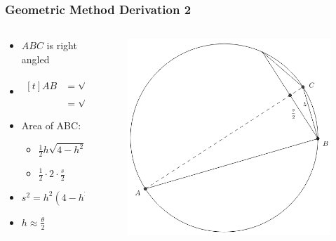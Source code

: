 \documentclass[12pt]{beamer}
\begin{document}
\begin{frame}
\frametitle{Geometric Method Derivation 2}
\begin{columns}
	\begin{column}{0.5\textwidth}
	\begin{itemize}[<+(1)->]
		\item \(ABC\) is right angled
		\item \(\begin{aligned}[t]AB &= \sqrt{AC^2 - BC^2}\\ &= \sqrt{4-h^2}\end{aligned}\)
		\item Area of ABC:
		\begin{itemize}[<+(1)->]
			\item \(\tfrac{1}{2}h\sqrt{4-h^2}\)\medskip
			\item \(\tfrac{1}{2}\cdot2\cdot\tfrac{s}{2}\)
		\end{itemize}
		\item \(s^2 = h^2(4 - h^2)\)
		\item \(h \approx \tfrac{\theta}{2}\)
	\end{itemize}
	\end{column}
	\begin{column}{0.5\textwidth}
		\begin{figure}
			\centering
			\includegraphics[width=\textwidth]{"./Diagrams/Geometric Trig Diagram 2"}
		\end{figure}
	\end{column}
\end{columns}
\end{frame}
\end{document}
